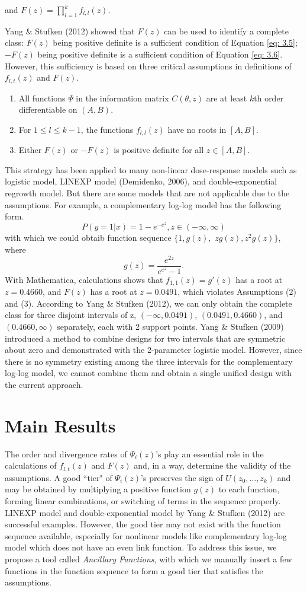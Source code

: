 \documentclass[12pt]{TD-CJS}
\begin{document}
and   $F(z) = \prod_{l=1}^k f_{l,l}(z)$. 

Yang \& Stufken (2012) showed that $F(z)$ can be used to identify a complete class: $F(z)$ being positive definite is a sufficient condition of Equation \eqref{eq: 3.5}; $-F(z)$ being positive definite is a sufficient condition of Equation \eqref{eq: 3.6}. However, this sufficiency is based on three critical assumptions in definitions of $f_{l,t}(z)$ and $F(z)$.
\begin{enumerate}[(1)]
\item All functions $\Psi$ in the information matrix $C(\theta,z)$ are at least $k$th order differentiable on $(A,B)$.
\item For $1\le l\le k-1$, the functions $f_{l,l}(z)$ have no roots in $[A,B]$.
\item Either $F(z)$ or $-F(z)$ is positive definite for all $z\in [A,B]$.
\end{enumerate} 


 This strategy has been applied to many non-linear dose-response models such as logistic model, LINEXP model (Demidenko, 2006), and double-exponential regrowth model. But there are some models that are not applicable due to the assumptions. For example, a complementary log-log model has the following form. \[P(y=1|x) = 1-e^{-e^{z}}, z\in(-\infty,\infty)\] with which we could obtaib function sequence $\{1,g(z),$ $zg(z),z^2g(z)\}$, where \[g(z)=\frac{e^{2z}}{e^{e^z}-1}.\] 
 With Mathematica, calculations shows that $f_{1,1}(z) = g'(z)$ has a root at $z=0.4660$, and $F(z)$ has a root at $z=0.0491$, which violates Assumptions (2) and (3). According to Yang \& Stufken (2012), we can only obtain the complete class for three disjoint intervals of z, $(-\infty, 0.0491)$, $(0.0491, 0.4660)$, and $(0.4660,\infty)$ separately, each with 2 support points. Yang \& Stufken (2009) introduced a method to combine designs for two intervals that are symmetric about zero and demonstrated with the 2-parameter logistic model. However, since there is no symmetry existing among the three intervals for the complementary log-log model, we cannot combine them and obtain a single unified design with the current approach.

 
\section{Main Results}\label{main}
The order and divergence rates of $\Psi_i(z)$'s play an essential role in the calculations of $f_{l,t}(z)$ and $F(z)$ and, in a way, determine the validity of the assumptions. A good ``tier" of $\Psi_i(z)$'s preserves the sign of $U(z_0,\ldots,z_k)$ and may be obtained by multiplying a positive function $g(z)$ to each function, forming linear combinations, or switching of terms in the sequence properly. LINEXP model and double-exponential model by Yang \& Stufken (2012) are successful examples. However, the good tier may not exist with the function sequence available, especially for nonlinear models like complementary log-log model which does not have an even link function. To address this issue, we propose a tool called \textit{Ancillary Functions}, with which we manually insert a few functions in the function sequence to form a good tier that satisfies the assumptions. 
\end{document}
